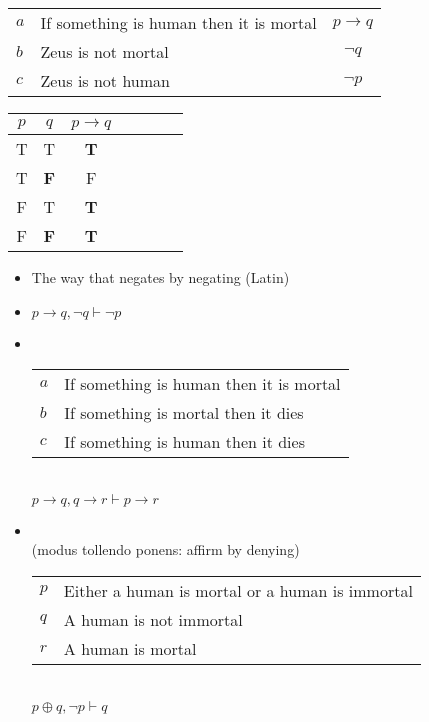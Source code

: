 \documentclass[a4paper,landscape,headrule,footrule,xetex]{foils}
\begin{document}
\begin{center}
  \begin{tabular}{llc}
    $a$ & If something is human then it is mortal & $p  \rightarrow q$\\
    $b$ & Zeus is not mortal  & $\neg q$ \\ \hline
    $c$ & Zeus is not human   & $\neg p$
  \end{tabular}

  \begin{tabular}{|c|c|c|c|c|c|c|}
    \hline
    $p$ & $q$ & $p \rightarrow q$  \\
    \hline
    T & T & \textbf{T}  \\ 
    T & \textbf{F} & F  \\ 
    F & T & \textbf{T}  \\ 
    \rowcolor{Gray}
    F & \textbf{F} & \textbf{T}  \\ 
    \hline
  \end{tabular}
\end{center}
\begin{itemize}
\item  The way that negates by negating (Latin)
\item $p \rightarrow q, \neg q \vdash \neg p$
\end{itemize}


\begin{itemize}
\item {}
\\[2ex]
 \begin{tabular}{ll}
    $a$ & If something is human then it is mortal \\
    $b$ & If something is mortal then it dies \\ \hline
    $c$ & If something is human then it dies
  \end{tabular}
\\ $p \rightarrow q, q \rightarrow r \vdash p \rightarrow r$

\item {}
\\ (modus tollendo ponens: affirm by denying)
\\[2ex]
 \begin{tabular}{ll}
    $p$ & Either a human is mortal or a human is immortal \\
    $q$ & A human is not immortal \\ \hline
    $r$ & A human is mortal
  \end{tabular}
\\ $p \oplus q, \neg p \vdash q$
\end{itemize}
\end{document}
